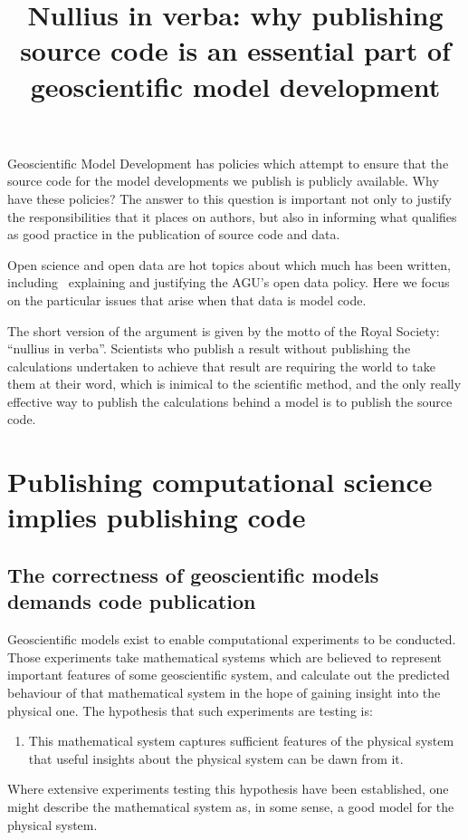 \documentclass[a4paper,11pt]{article}
\begin{document}
\title{Nullius in verba: why publishing source code is an essential part of geoscientific
  model development}

\maketitle

Geoscientific Model Development has policies which attempt to ensure that
the source code for the model developments we publish is publicly
available. Why have these policies? The answer to this question is
important not only to justify the responsibilities that it places on
authors, but also in informing what qualifies as good practice in the
publication of source code and data.

Open science and open data are hot topics about which much has been written,
including \cite{Brewer2017}\ explaining and justifying the AGU's open data
policy. Here we focus on the particular issues that arise when that data is
model code.

The short version of the argument is given by the motto of the Royal
Society: ``nullius in verba''. Scientists who publish a result without
publishing the calculations undertaken to achieve that result are requiring
the world to take them at their word, which is inimical to the scientific
method, and the only really effective way to publish the calculations behind
a model is to publish the source code.


\section{Publishing computational science implies publishing code}

\subsection{The correctness of geoscientific models demands code publication}

Geoscientific models exist to enable computational experiments to be
conducted. Those experiments take mathematical systems which are believed to
represent important features of some geoscientific system, and calculate out
the predicted behaviour of that mathematical system in the hope of gaining
insight into the physical one. The hypothesis that such experiments are
testing is:
\begin{enumerate}
\addtocounter{enumi}{-1}
\item This mathematical system captures sufficient features
of the physical system that useful insights about the physical system can be
dawn from it.
\end{enumerate}
Where extensive experiments testing this hypothesis have
been established, one might describe the mathematical system as, in some
sense, a good model for the physical system.
\end{document}
